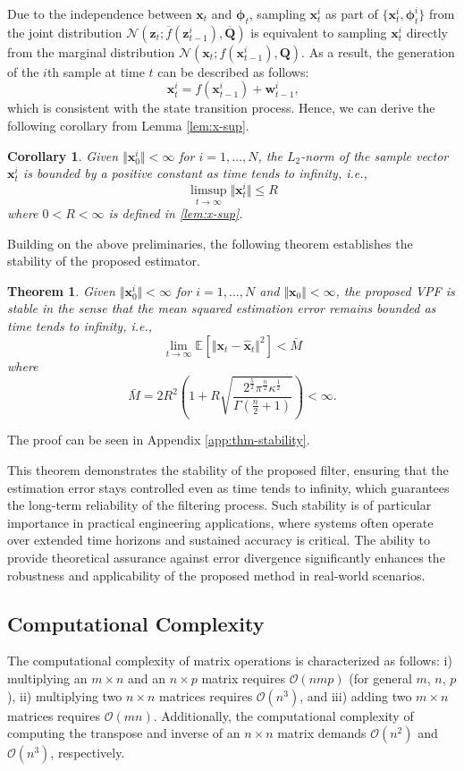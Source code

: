 \documentclass[10pt,twocolumn,twoside]{IEEEtran}
\newtheorem{theorem}{Theorem}
\newtheorem{corollary}{Corollary}
\newcommand{\E}[2][]{ \mathbb{E}_{#1}\left[#2\right] } %
\newcommand{\cm}{\text{,}} %
\newcommand{\fs}{\text{.}} %
\newcommand{\x}{{ \bm{x} }}
\newcommand{\z}{{ \bm{z} }}
\begin{document}
Due to the independence between $\x_t$ and $\bm\phi_t$, sampling $\x_t^i$ as part of $\{\x_t^i, \bm\phi_t^i\}$ from the joint distribution $\mathcal{N}(\z_t; \overline{f}(\z_{t-1}^i), \overline{\bm{Q}})$ is equivalent to sampling $\x_t^i$ directly from the marginal distribution $\mathcal{N}(\x_t; f(\x_{t-1}^i), \bm{Q})$. As a result, the generation of the $i$th sample at time $t$ can be described as follows:
$$
\x_t^i = f(\x_{t-1}^i) + \bm{w}_{t-1}^i \cm
$$
which is consistent with the state transition process. Hence, we can derive the following corollary from Lemma \ref{lem:x-sup}.
\begin{corollary} \label{cor:xi-sup}
Given $\Vert\x_0^i\Vert<\infty$ for $i=1,\dots,N$, the $L_2$-norm of the sample vector $\x_t^i$ is bounded by a positive constant as time tends to infinity, i.e., 
$$ \limsup_{t\rightarrow\infty}\Vert\x_t^i\Vert \leq R $$
where $0<R<\infty$ is defined in \ref{lem:x-sup}. 
\end{corollary}

Building on the above preliminaries, the following theorem establishes the stability of the proposed estimator.
\begin{theorem} \label{thm:stability}
Given $\Vert\x_0^i\Vert<\infty$ for $i=1,\dots,N$ and $\Vert\x_0\Vert<\infty$, the proposed VPF is stable in the sense that the mean squared estimation error remains bounded as time tends to infinity, i.e.,
$$
\lim_{t\rightarrow\infty}\E{\Vert\x_t-\hat\x_t\Vert^2} < \bar{M}
$$
where
$$
\bar{M} = 2R^2\left(1 + R\sqrt{\frac{2^\frac{5}{2}\pi^{\frac{n}{2}}\kappa^\frac{1}{2}}{\Gamma(\frac{n}{2}+1)}}\right) < \infty \fs
$$
\end{theorem}
\begin{IEEEproof}
    The proof can be seen in Appendix \ref{app:thm-stability}.
\end{IEEEproof}

This theorem demonstrates the stability of the proposed filter, ensuring that the estimation error stays controlled even as time tends to infinity, which guarantees the long-term reliability of the filtering process. Such stability is of particular importance in practical engineering applications, where systems often operate over extended time horizons and sustained accuracy is critical. The ability to provide theoretical assurance against error divergence significantly enhances the robustness and applicability of the proposed method in real-world scenarios.

\subsection{Computational Complexity}
The computational complexity of matrix operations is characterized as follows: i) multiplying an $m\times n$ and an $n\times p$ matrix requires $\mathcal{O}(nmp)$ (for general $m$, $n$, $p$), ii) multiplying two $n\times n$ matrices requires $\mathcal{O}(n^3)$, and iii) adding two $m\times n$ matrices requires $\mathcal{O}(mn)$. Additionally, the computational complexity of computing the transpose and inverse of an $n\times n$ matrix demands $\mathcal{O}(n^2)$ and $\mathcal{O}(n^3)$, respectively.
\end{document}

